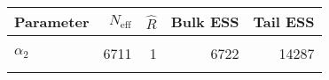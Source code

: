 \begin{table}[!h]
\centering
\begin{tabular}{>{\raggedright\arraybackslash}p{2cm}rrrr}
\toprule
Parameter & $N_{\text{eff}}$ & $\widehat{R}$ & Bulk ESS & Tail ESS\\
\midrule
\cellcolor{gray!6}{$\alpha_{0}$} & \cellcolor{gray!6}{5812} & \cellcolor{gray!6}{1} & \cellcolor{gray!6}{5815} & \cellcolor{gray!6}{12113}\\
$\alpha_{2}$ & 6711 & 1 & 6722 & 14287\\
\cellcolor{gray!6}{$\rho$} & \cellcolor{gray!6}{4737} & \cellcolor{gray!6}{1} & \cellcolor{gray!6}{4767} & \cellcolor{gray!6}{4389}\\
\bottomrule
\end{tabular}
\end{table}